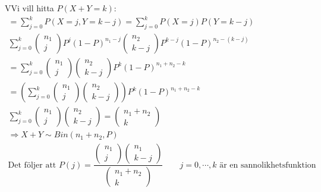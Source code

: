 \begin{prf}
  VVi vill hitta $P(X+Y=k)$:
  \begin{equation*}
    \begin{gathered}
      = \sum_{j=0}^{k}P(X=j, Y=k-j)= \sum_{j=0}^{k}P(X=j)P(Y=k-j)\\
      \sum_{j=0}^{k}\begin{pmatrix}n_1\\j\end{pmatrix}P^j(1-P)^{n_1-j}\begin{pmatrix}n_2\\k-j\end{pmatrix}P^{k-j}(1-P)^{n_2-(k-j)}\\
      = \sum_{j=0}^{k}\begin{pmatrix}n_1\\j\end{pmatrix}\begin{pmatrix}n_2\\k-j\end{pmatrix}P^k(1-P)^{n_1+n_2-k}\\
      = \left(\sum_{j=0}^{k}\begin{pmatrix}n_1\\j\end{pmatrix}\begin{pmatrix}n_2\\k-j\end{pmatrix}\right)P^k(1-P)^{n_1+n_2-k}\\
      \sum_{j=0}^{k}\begin{pmatrix}n_1\\j\end{pmatrix}\begin{pmatrix}n_2\\k-j\end{pmatrix} = \begin{pmatrix}n_1+n_2\\k\end{pmatrix}\\
      \Rightarrow X+Y\sim Bin(n_1+n_2,P)\\
      \text{Det följer att } P(j) = \dfrac{\begin{pmatrix}n_1\\j\end{pmatrix}\begin{pmatrix}n_1\\k-j\end{pmatrix}}{\begin{pmatrix}n_1+n_2\\k\end{pmatrix}}\qquad j = 0,\cdots, k \text{ är en sannolikhetsfunktion}
    \end{gathered}
  \end{equation*}
\end{prf}
